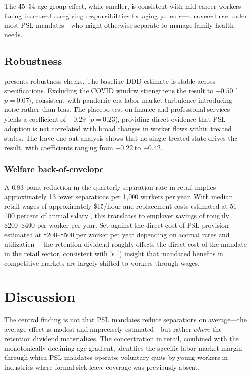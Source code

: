 \documentclass[12pt]{article}
\begin{document}
The 45--54 age group effect, while smaller, is consistent with mid-career workers facing increased caregiving responsibilities for aging parents---a covered use under most PSL mandates---who might otherwise separate to manage family health needs.

\subsection{Robustness}



 presents robustness checks. The baseline DDD estimate is stable across specifications. Excluding the COVID window strengthens the result to $-0.50$ ($p = 0.07$), consistent with pandemic-era labor market turbulence introducing noise rather than bias. The placebo test on finance and professional services yields a coefficient of $+0.29$ ($p = 0.23$), providing direct evidence that PSL adoption is not correlated with broad changes in worker flows within treated states. The leave-one-out analysis shows that no single treated state drives the result, with coefficients ranging from $-0.22$ to $-0.42$.

\subsubsection*{Welfare back-of-envelope} A 0.83-point reduction in the quarterly separation rate in retail implies approximately 13 fewer separations per 1,000 workers per year. With median retail wages of approximately \$15/hour and replacement costs estimated at 50--100 percent of annual salary \citep{boushey2012}, this translates to employer savings of roughly \$200--\$400 per worker per year. Set against the direct cost of PSL provision---estimated at \$200--\$500 per worker per year depending on accrual rates and utilization \citep{hill2022}---the retention dividend roughly offsets the direct cost of the mandate in the retail sector, consistent with \citeauthor{gruber1994}'s (\citeyear{gruber1994}) insight that mandated benefits in competitive markets are largely shifted to workers through wages.

\section{Discussion}

The central finding is not that PSL mandates reduce separations on average---the average effect is modest and imprecisely estimated---but rather \textit{where} the retention dividend materializes. The concentration in retail, combined with the monotonically declining age gradient, identifies the specific labor market margin through which PSL mandates operate: voluntary quits by young workers in industries where formal sick leave coverage was previously absent.
\end{document}
